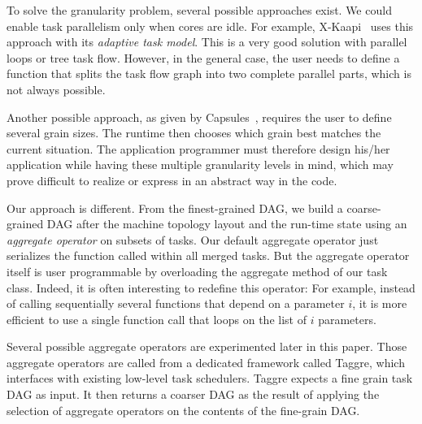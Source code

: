 
To solve the granularity problem, several possible approaches exist. We
could enable task parallelism only when cores are idle. For example,
X-Kaapi~\cite{xkaapi} uses this approach with its {\em adaptive task model}.
This is a very good solution with parallel loops or tree task flow.
However, in the general case, the user needs to define a function that
splits the task flow graph into two complete parallel parts, which is
not always possible.

Another possible approach, as given by Capsules~\cite{capsules},
requires the user to define several grain sizes. The 
runtime then chooses which grain best matches the current situation. The
application programmer must therefore design his/her application while
having these multiple granularity levels in mind, which may prove
difficult to realize or express in an abstract way in the code.

Our approach is different. From the finest-grained DAG, we build a
coarse-grained DAG after the machine topology layout and the run-time
state using an {\em aggregate operator} on subsets of tasks. 
Our default aggregate operator just serializes the function called within all 
merged tasks. But the aggregate operator itself is user programmable by overloading the aggregate method 
of our task class. Indeed, it is often interesting to redefine this
operator: For example, instead of calling sequentially several functions that depend on a parameter 
$i$, it is more efficient to use a single function call that loops on the list of $i$ parameters.

Several possible aggregate operators are experimented later in this paper.
Those aggregate operators are called from a dedicated framework
called Taggre, which interfaces with existing low-level task
schedulers. Taggre expects a fine grain task DAG as input. It then
returns a coarser DAG as the result of applying the selection of aggregate
operators on the contents of the fine-grain DAG.

